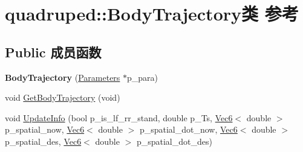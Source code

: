 \hypertarget{classquadruped_1_1BodyTrajectory}{}\section{quadruped\+:\+:Body\+Trajectory类 参考}
\label{classquadruped_1_1BodyTrajectory}
\subsection*{Public 成员函数}
\begin{DoxyCompactItemize}
\item 
\mbox{\label{classquadruped_1_1BodyTrajectory_a676f710f4d779a54461a74fc2466b831}} 
{\bfseries Body\+Trajectory} (\hyperlink{classquadruped_1_1Parameters}{Parameters} $\ast$p\+\_\+para)
\item 
void \hyperlink{classquadruped_1_1BodyTrajectory_ae7dfc17baf5ea44b346b3ee7bc7c2cea}{Get\+Body\+Trajectory} (void)
\item 
void \hyperlink{classquadruped_1_1BodyTrajectory_a633b42ab0022c3cedeb719287e9ae9b2}{Update\+Info} (bool p\+\_\+is\+\_\+lf\+\_\+rr\+\_\+stand, double p\+\_\+\+Ts, \hyperlink{cppTypes_8h_a27bb8a600520708a5928332e4e52a92e}{Vec6}$<$ double $>$ p\+\_\+spatial\+\_\+now, \hyperlink{cppTypes_8h_a27bb8a600520708a5928332e4e52a92e}{Vec6}$<$ double $>$ p\+\_\+spatial\+\_\+dot\+\_\+now, \hyperlink{cppTypes_8h_a27bb8a600520708a5928332e4e52a92e}{Vec6}$<$ double $>$ p\+\_\+spatial\+\_\+des, \hyperlink{cppTypes_8h_a27bb8a600520708a5928332e4e52a92e}{Vec6}$<$ double $>$ p\+\_\+spatial\+\_\+dot\+\_\+des)
\end{DoxyCompactItemize}
